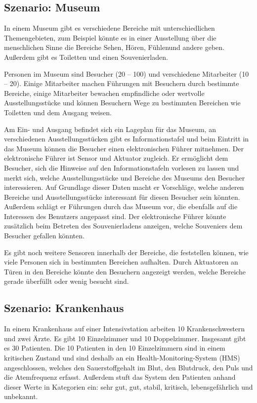 \subsection*{Szenario: Museum}
 
In einem Museum gibt es verschiedene Bereiche mit unterschiedlichen Themengebieten, zum Beispiel könnte es in einer Ausstellung über die menschlichen Sinne die Bereiche \glqq Sehen\grqq , \glqq Hören\grqq, \glqq Fühlen\grqq und andere geben. Außerdem gibt es Toiletten und einen Souvenierladen.

Personen im Museum sind Besucher (20 – 100) und verschiedene Mitarbeiter (10 – 20). Einige Mitarbeiter machen Führungen mit Besuchern durch bestimmte Bereiche, einige Mitarbeiter bewachen empfindliche oder wertvolle Ausstellungsstücke und können Besuchern Wege zu bestimmten Bereichen wie Toiletten und dem Ausgang weisen.

Am Ein- und Ausgang befindet sich ein Lageplan für das Museum, an verschiedenen Ausstellungsstücken gibt es Informationstafel und beim Eintritt in das Museum können die Besucher einen elektronischen Führer mitnehmen. Der elektronische Führer ist Sensor und Aktuator zugleich. Er ermöglicht dem Besucher, sich die Hinweise auf den Informationstafeln vorlesen zu lassen und merkt sich, welche Ausstellungsstücke und Bereiche des Museums den Besucher interessieren. Auf Grundlage dieser Daten macht er Vorschläge, welche anderen Bereiche und Ausstellungsstücke interessant für diesen Besucher sein könnten. Außerdem schlägt er Führungen durch das Museum vor, die ebenfalls auf die Interessen des Benutzers angepasst sind. Der elektronische Führer könnte zusätzlich beim Betreten des Souvenierladens anzeigen, welche Souveniers dem Besucher gefallen könnten.

Es gibt noch weitere Sensoren innerhalb der Bereiche, die feststellen können, wie viele Personen sich in bestimmten Bereichen aufhalten. Durch Aktuatoren an Türen in den Bereiche könnte den Besuchern angezeigt werden, welche Bereiche gerade überfüllt oder wenig besucht sind.

\subsection*{Szenario: Krankenhaus}

In einem Krankenhaus auf einer Intensivstation arbeiten 10 Krankenschwestern und zwei Ärzte. Es gibt 10 Einzelzimmer und 10 Doppelzimmer. Insgesamt gibt es 30 Patienten. Die 10 Patienten in den 10 Einzelzimmern sind in einem kritischen Zustand und sind deshalb an ein Health-Monitoring-System (HMS) angeschlossen, welches den Sauerstoffgehalt im Blut, den Blutdruck, den Puls und die Atemfrequenz erfasst. Außerdem stuft das System den Patienten anhand dieser Werte in Kategorien ein: sehr gut, gut, stabil, kritisch, lebensgefährlich und unbekannt.

